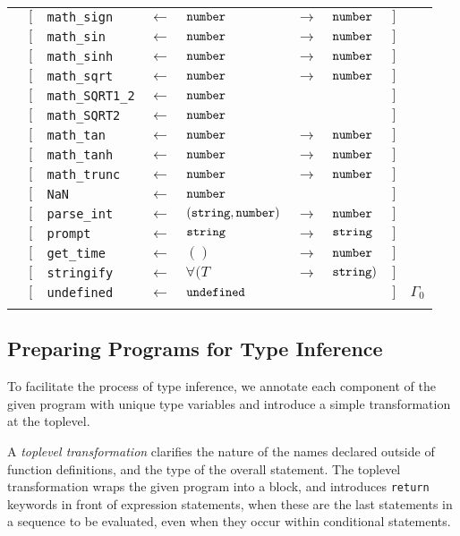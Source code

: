 \begin{tabular}[fragile]{lllllllll}
& $[$ & \texttt{math\_sign} & $\leftarrow$  & $\texttt{number}$ & $\rightarrow$ & $\texttt{number}$ & $]$ \\
& $[$ & \texttt{math\_sin} & $\leftarrow$  & $\texttt{number}$ & $\rightarrow$ & $\texttt{number}$ & $]$ \\
& $[$ & \texttt{math\_sinh} & $\leftarrow$  & $\texttt{number}$ & $\rightarrow$ & $\texttt{number}$ & $]$ \\
& $[$ & \texttt{math\_sqrt} & $\leftarrow$  & $\texttt{number}$ & $\rightarrow$ & $\texttt{number}$ & $]$ \\
& $[$ & \texttt{math\_SQRT1\_2} & $\leftarrow$  & $\texttt{number}$ & & & $]$ \\
& $[$ & \texttt{math\_SQRT2} & $\leftarrow$  & $\texttt{number}$ & & & $]$ \\
& $[$ & \texttt{math\_tan} & $\leftarrow$  & $\texttt{number}$ & $\rightarrow$ & $\texttt{number}$ & $]$ \\
& $[$ & \texttt{math\_tanh} & $\leftarrow$  & $\texttt{number}$ & $\rightarrow$ & $\texttt{number}$ & $]$ \\
& $[$ & \texttt{math\_trunc} & $\leftarrow$  & $\texttt{number}$ & $\rightarrow$ & $\texttt{number}$ & $]$ \\
& $[$ & \texttt{NaN} & $\leftarrow$  & $\texttt{number}$ & & & $]$ \\
& $[$ & \texttt{parse\_int} & $\leftarrow$  & $(\texttt{string}, \texttt{number})$ & $\rightarrow$ & $\texttt{number}$ & $]$ \\
& $[$ & \texttt{prompt} & $\leftarrow$  & $\texttt{string}$ & $\rightarrow$ & $\texttt{string}$ & $]$ \\
& $[$ & \texttt{get\_time} & $\leftarrow$  & $()$ & $\rightarrow$ & $\texttt{number}$ & $]$ \\
& $[$ & \texttt{stringify} & $\leftarrow$  & $\forall(T$ & $\rightarrow$ & $\texttt{string})$ & $]$ \\
& $[$ & \texttt{undefined} & $\leftarrow$  & $\texttt{undefined}$ & & & $]$ & $\Gamma_0$ \\
& \end{tabular}
 
\subsection{Preparing Programs for Type Inference}

To facilitate the process of type inference, we annotate each component of the given
program with unique type variables and introduce a simple transformation at the toplevel.

A \emph{toplevel transformation} clarifies the nature
of the names declared outside of function definitions,
and the type of the overall statement. The toplevel
transformation wraps the given program into a block, and introduces \lstinline{return}
keywords in front of expression statements, when these are the last statements in a
sequence to be evaluated, even when they occur within conditional statements.

